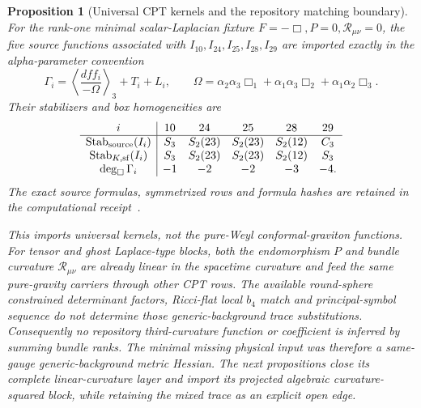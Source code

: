 \documentclass[11pt]{article}
\newtheorem{proposition}[theorem]{Proposition}
\theoremstyle{definition}
\theoremstyle{remark}
\begin{document}
\begin{proposition}[Universal CPT kernels and the repository matching boundary]
For the rank-one minimal scalar-Laplacian fixture
\(
 F=-\Box, P=0, \mathcal R_{\mu\nu}=0
\), the five source functions associated with
\(I_{10},I_{24},I_{25},I_{28},I_{29}\) are imported exactly in the
alpha-parameter convention
\[
 \Gamma_i=\left\langle\frac{dff_i}{-\Omega}\right\rangle_3+T_i+L_i,
 \qquad
 \Omega=\alpha_2\alpha_3\Box_1+
        \alpha_1\alpha_3\Box_2+
        \alpha_1\alpha_2\Box_3.
\]
Their stabilizers and box homogeneities are
\[
\begin{array}{c|ccccc}
i&10&24&25&28&29\\ \hline
\operatorname{Stab}_{\rm source}(I_i)&S_3&S_2(23)&S_2(23)&S_2(12)&C_3\\
\operatorname{Stab}_{K,\rm sf}(I_i)&S_3&S_2(23)&S_2(23)&S_2(12)&S_3\\
\deg_{\Box}\Gamma_i&-1&-2&-2&-3&-4.
\end{array}
\]
The exact source formulas, symmetrized rows and formula hashes are retained
in the computational receipt~\cite{BarvinskyCPT}.

This imports universal kernels, not the pure-Weyl conformal-graviton
functions.  For tensor and ghost Laplace-type blocks, both the endomorphism
\(P\) and bundle curvature \(\mathcal R_{\mu\nu}\) are already linear in the
spacetime curvature and feed the same pure-gravity carriers through other
CPT rows.  The available round-sphere constrained determinant factors,
Ricci-flat local \(b_4\) match and principal-symbol sequence do not determine
those generic-background trace substitutions.  Consequently no repository
third-curvature function or coefficient is inferred by summing bundle ranks.
The minimal missing physical input was therefore a same-gauge
generic-background metric Hessian.  The next propositions close its complete
linear-curvature layer and import its projected algebraic curvature-squared
block, while retaining the mixed trace as an explicit open edge.
\end{proposition}
\end{document}
